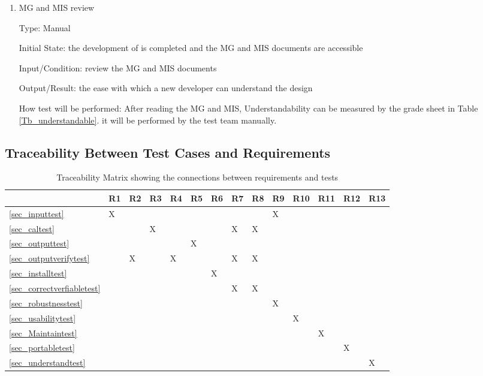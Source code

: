 \documentclass[12pt, titlepage]{article}
\begin{document}
\begin{enumerate}
\item{MG and MIS review}

Type: Manual
					
Initial State: the development of \progname{} is completed and the MG and MIS documents are accessible
					
Input/Condition: review the MG and MIS documents
					
Output/Result: the ease
with which a new developer can understand the design
					
How test will be performed: After reading the MG and MIS, Understandability can be measured by the grade sheet in Table \ref{Tb_understandable}. it  will  be  performed  by  the  test  team manually.

\end{enumerate}

\subsection{Traceability Between Test Cases and Requirements}

\begin{table}[h]
\begin{tabular}{|l|l|l|l|l|l|l|l|l|l|l|l|l|l|}
\hline
 & R1 & R2 & R3 & R4 & R5 & R6 & R7 & R8 & R9 & R10 & R11 & R12 & R13 \\ \hline
\ref{sec_inputtest} & X &  &  &  &  &  &  &  & X &  &  &  &  \\ \hline
\ref{sec_caltest} &  &  & X &  &  &  & X & X &  &  &  &  &  \\ \hline
\ref{sec_outputtest} &  &  &  &  & X &  &  &  &  &  &  &  &  \\ \hline
\ref{sec_outputverifytest} &  & X &  & X &  &  & X & X &  &  &  &  &  \\ \hline
\ref{sec_installtest} &  &  &  &  &  & X &  &  &  &  &  &  &  \\ \hline
\ref{sec_correctverfiabletest} &  &  &  &  &  &  & X & X &  &  &  &  &  \\ \hline
\ref{sec_robustnesstest} &  &  &  &  &  &  &  &  & X &  &  &  &  \\ \hline
\ref{sec_usabilitytest} &  &  &  &  &  &  &  &  &  & X &  &  &  \\ \hline
\ref{sec_Maintaintest} &  &  &  &  &  &  &  &  &  &  & X &  &  \\ \hline
\ref{sec_portabletest} &  &  &  &  &  &  &  &  &  &  &  & X &  \\ \hline
\ref{sec_understandtest} &  &  &  &  &  &  &  &  &  &  &  &  & X \\ \hline
\end{tabular}
\caption{Traceability Matrix showing the connections between requirements and tests}
\label{Tb_trace}
\end{table}
\end{document}
